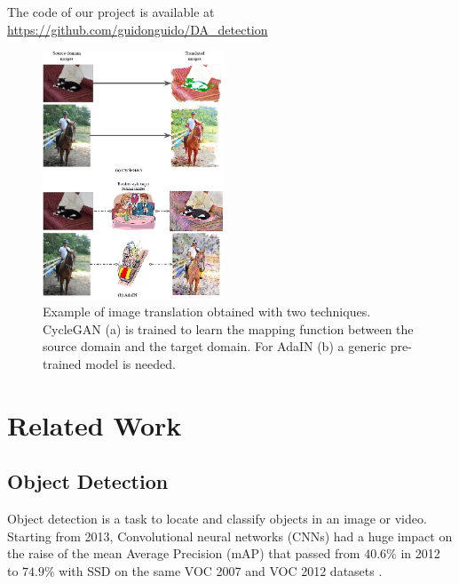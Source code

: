 \documentclass[10pt,twocolumn,letterpaper]{article}
\begin{document}
The code of our project is available at \url{ https://github.com/guidonguido/DA_detection}






\begin{figure}
\begin{center}
   \includegraphics[width=0.48\textwidth]{Images/Translation2.jpg}
\end{center}
   \caption{Example of image translation obtained with two techniques. CycleGAN (a) is trained to learn the mapping function between the source domain and the target domain. For AdaIN (b) a generic pre-trained model is needed.}
\label{fig:Translation}
\end{figure}

\section{Related Work}
\subsection{Object Detection}
Object detection is a task to locate and classify objects in an image or video. Starting from 2013, Convolutional neural networks (CNNs) had a huge impact on the raise of the mean Average Precision (mAP) that passed from \(40.6\textit{\%}\) in 2012 \cite{shallowOD} to \(74.9\textit{\%}\) with SSD \cite{SSD} on the same VOC 2007 and VOC 2012 datasets \cite{VOC}.
\end{document}
